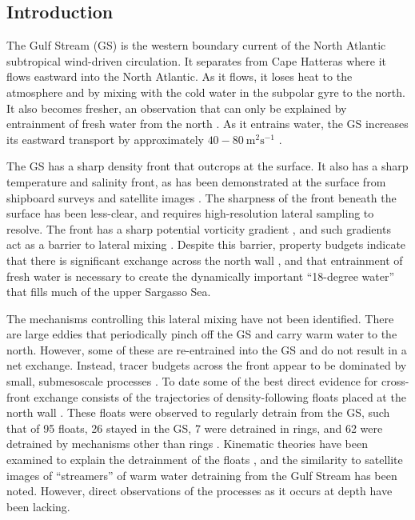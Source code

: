 \documentclass[draft,grl]{agutex2015}
\begin{document}
\begin{article}

%
%

\section{Introduction}

The Gulf Stream (GS) is the western boundary current of the North Atlantic subtropical wind-driven circulation.  It separates from Cape Hatteras where it flows eastward into the North Atlantic.  As it flows, it loses heat to  the atmosphere and by mixing with the cold water in the subpolar gyre to the north.  It also becomes fresher, an observation that can only be explained by entrainment of fresh water from the north \citep{joyceetal13}.  As it entrains water, the GS  increases its eastward transport by approximately $40-80\ \mathrm{m^2s^{-1}}$ \citep{johnsetal95}.   

The GS has a sharp density front that outcrops at the surface. It also has a sharp temperature and salinity front, as has been demonstrated at the surface from shipboard surveys \citep{fordetal52} and satellite images \citep{churchilletal89}. The sharpness of the front beneath the surface has been less-clear, and requires high-resolution lateral sampling to resolve. The front has a sharp potential vorticity gradient \citep{rajamonyetal01}, and such gradients act as a barrier to lateral mixing \citep{marshalletal06,naveiraetal11}.  Despite this  barrier, property budgets indicate that there is significant exchange across the north wall \citep{joyceetal13}, and that entrainment of fresh water is necessary to create the dynamically important ``18-degree water'' that fills much of the upper Sargasso Sea. 

The mechanisms controlling this lateral mixing have not been identified. There are large eddies that periodically pinch off the GS and carry warm water to the north. However, some of these are re-entrained into the GS and do not result in a net exchange. Instead, tracer budgets across the front appear to be dominated by small, submesoscale processes \citep{boweretal85}. To date some of the best direct evidence for cross-front exchange consists of the trajectories of density-following floats placed at the north wall \citep{bowerrossby89,bowerlozier94}.  These floats were observed to regularly detrain from the GS, such that of 95 floats, 26 stayed in the GS, 7 were detrained in rings, and 62 were detrained by mechanisms other than rings \citep{bowerlozier94}.  Kinematic theories have been examined to explain the detrainment of the floats \citep{flierletal87,stern85,prattetal95}, and the similarity to satellite images of ``streamers'' of warm water detraining from the Gulf Stream has been noted.  However, direct observations of the  processes as it occurs at depth have been lacking.  


\end{article}
\end{document}
